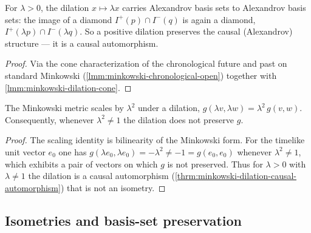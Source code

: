 \medskip

\begin{theorem}
    \label{thrm:minkowski-dilation-causal-automorphism}
    \leanok
    For $\lambda > 0$, the dilation $x \mapsto \lambda x$ carries Alexandrov basis sets to Alexandrov basis sets: the image of a diamond $I^+(p) \cap I^-(q)$ is again a diamond, $I^+(\lambda p) \cap I^-(\lambda q)$. So a positive dilation preserves the causal (Alexandrov) structure --- it is a causal automorphism.
\end{theorem}
\begin{proof}
    \leanok
    Via the cone characterization of the chronological future and past on standard Minkowski (\ref{lmm:minkowski-chronological-open}) together with \ref{lmm:minkowski-dilation-cone}.
\end{proof}

\medskip

\begin{theorem}
    \label{thrm:minkowski-dilation-not-isometry}
    \leanok
    The Minkowski metric scales by $\lambda^2$ under a dilation, $g(\lambda v, \lambda w) = \lambda^2\, g(v,w)$. Consequently, whenever $\lambda^2 \neq 1$ the dilation does not preserve $g$.
\end{theorem}
\begin{proof}
    \leanok
    The scaling identity is bilinearity of the Minkowski form. For the timelike unit vector $e_0$ one has $g(\lambda e_0, \lambda e_0) = -\lambda^2 \neq -1 = g(e_0, e_0)$ whenever $\lambda^2 \neq 1$, which exhibits a pair of vectors on which $g$ is not preserved. Thus for $\lambda > 0$ with $\lambda \neq 1$ the dilation is a causal automorphism (\ref{thrm:minkowski-dilation-causal-automorphism}) that is not an isometry.
\end{proof}

\subsection{Isometries and basis-set preservation}

